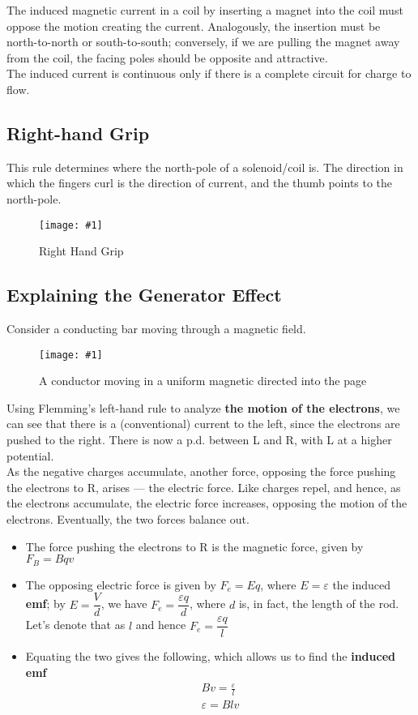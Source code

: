 \documentclass[a4paper,12pt]{article}
\newcommand{\lb}{\\[8pt]}
\newcommand{\img}[4]{\begin{center}
  \begin{figure}[H]
    \centering
    \texttt{[image: \#1]}
    \caption{#3}
    \label{fig:#4}
  \end{figure}
\end{center}}
\begin{document}
The induced magnetic current in a coil by inserting a magnet into the coil must oppose the motion creating the current. Analogously, the insertion must be north-to-north or south-to-south; conversely, if we are pulling the magnet away from the coil, the facing poles should be opposite and attractive.\lb
The induced current is continuous only if there is a complete circuit for charge to flow.

\subsection{Right-hand Grip}

This rule determines where the north-pole of a solenoid/coil is. The direction in which the fingers curl is the direction of current, and the thumb points to the north-pole.

\img{righthandgrip.jpg}{0.65}{Right Hand Grip}{rhgrip}

\subsection{Explaining the Generator Effect}

Consider a conducting bar moving through a magnetic field.
\img{bar.png}{0.6}{A conductor moving in a uniform magnetic directed into the page}{bar}
Using Flemming's left-hand rule to analyze \textbf{the motion of the electrons}, we can see that there is a (conventional) current to the left, since the electrons are pushed to the right. There is now a p.d. between L and R, with L at a higher potential.\lb
As the negative charges accumulate, another force, opposing the force pushing the electrons to R, arises --- the electric force. Like charges repel, and hence, as the electrons accumulate, the electric force increases, opposing the motion of the electrons. Eventually, the two forces balance out.
\begin{itemize}
  \item The force pushing the electrons to R is the magnetic force, given by $F_B = Bqv$
  \item The opposing electric force is given by $F_e = Eq$, where $E = \varepsilon$ the induced \textbf{emf}; by $E = \dfrac{V}{d}$, we have $F_e = \dfrac{\varepsilon q}{d}$, where $d$ is, in fact, the length of the rod. Let's denote that as $l$ and hence $F_e = \dfrac{\varepsilon q}{l}$
  \item Equating the two gives the following, which allows us to find the \textbf{induced emf}
        \begin{align*}
          Bv = \frac{\varepsilon}{l} \\
          \varepsilon = Blv
        \end{align*}
\end{itemize}
\end{document}
